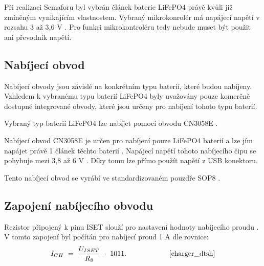 Při realizaci Semaforu byl vybrán článek baterie LiFePO4 právě kvůli již zmíněným vynikajícím vlastnostem. Vybraný mikrokonrolér má napájecí napětí v rozsahu 3 až 3,6 V \cite{ESP_C3_dtsh}. 
Pro funkci mikrokontroléru tedy nebude muset být použit ani převodník napětí.  

\subsection{Nabíjecí obvod}
Nabíjecí obvody jsou závislé na konkrétním typu baterií, které budou nabíjeny. Vzhledem k vybranému typu baterií LiFePO4 byly uvažovány pouze komerčně
dostupné integrované obvody, které jsou určeny pro nabíjení tohoto typu baterií. 

Vybraný typ baterií LiFePO4 lze nabíjet pomocí obvodu CN3058E \cite{charger_dtsh}. 


Nabíjecí obvod CN3058E je určen pro nabíjení pouze LiFePO4 baterií a lze jím napájet právě 1 článek těchto baterií \cite{charger_dtsh}. Napájecí napětí tohoto 
nabíjecího čipu se pohybuje mezi 3,8 až 6 V \cite{charger_dtsh}. Díky tomu lze přímo použít napětí z USB konektoru. 



Tento nabíjecí obvod se vyrábí ve standardizovaném pouzdře SOP8 \cite{charger_dtsh}.

\subsection{Zapojení nabíjecího obvodu}
Rezistor připojený k pinu ISET slouží pro nastavení hodnoty nabíjecího proudu \cite{charger_dtsh}. V tomto zapojení byl počítán pro nabíjecí proud 1 A dle rovnice: 
\begin{equation} 
  I_{CH}~=~\frac{U_{ISET}}{R_{8}}~\cdot~1011. 
  \quad \quad \quad \quad \quad \quad \cite{charger_dtsh}
\label{eq:I_CH}
\end{equation}

